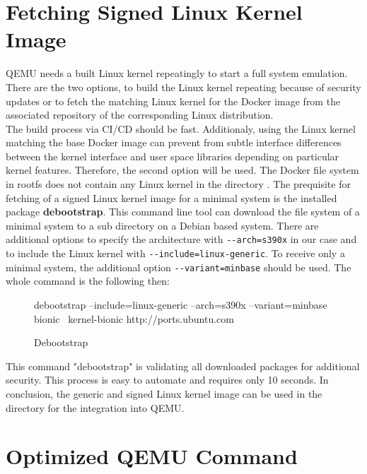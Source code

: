 \section{Fetching Signed Linux Kernel Image} \label{LinuxKernel}

\gls{QEMU} needs a built Linux kernel repeatingly to start a full system emulation. There are the two options, to build the Linux kernel repeating because of security updates or to fetch the matching Linux kernel for the Docker image from the associated repository of the corresponding Linux distribution. \\ 
The build process via \gls{CI/CD} should be fast. Additionaly, using the Linux kernel matching the base Docker image can prevent from subtle interface differences between the kernel interface and user space libraries depending on particular kernel features. 
Therefore, the second option will be used. The Docker file system in rootfs does not contain any Linux kernel in the directory .
The prequisite for fetching of a signed Linux kernel image for a minimal system is the installed package \textbf{debootstrap}. This command line tool can download the file system of a minimal system to a sub directory on a Debian based system. There are additional options to specify the architecture with \lstinline!--arch=s390x! in our case and to include the Linux kernel with \lstinline!--include=linux-generic!. To receive only a minimal system, the additional option \lstinline!--variant=minbase! should be used. The whole command is the following then: \\
\begin{figure}[H]
\begin{boxedverbatim}
debootstrap --include=linux-generic --arch=s390x --variant=minbase bionic \
kernel-bionic http://ports.ubuntu.com 
\end{boxedverbatim}
\caption{Debootstrap}
    \label{Debootstrap}
\end{figure}

This command "debootstrap" is validating all downloaded packages for additional security. This process is easy to automate and requires only 10 seconds. In conclusion, the generic and signed Linux kernel image can be used in the  directory for the integration into \gls{QEMU}.
 

\section{Optimized \gls{QEMU} Command}\label{Optimized-Qemu-Command}


